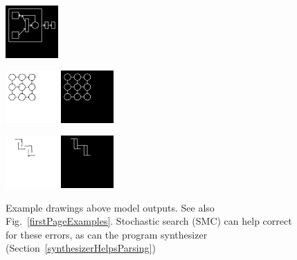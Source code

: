\documentclass{article}
\begin{document}
\begin{figure}[H]
\begin{minipage}[t]{2.25cm}
    \includegraphics[width = 2cm]{figures/expert-1-parse.png}    
  \end{minipage}
  \begin{minipage}[t]{2.25cm}
    \includegraphics[width = 2cm]{figures/expert-38.png}
    \includegraphics[width = 2cm]{figures/38-parse.png}     
  \end{minipage}
  \begin{minipage}[t]{2.25cm}
    \includegraphics[width = 2cm]{figures/expert-34.png}
    \includegraphics[width = 2cm]{figures/34-parse.png}     
    \end{minipage}
  \caption{Example drawings above model outputs. See also Fig.~\ref{firstPageExamples}. Stochastic search (SMC) can help correct for these errors, as can the program synthesizer (Section~\ref{synthesizerHelpsParsing})}\label{lotsOfHandDrawings}
\end{figure}
\end{document}
